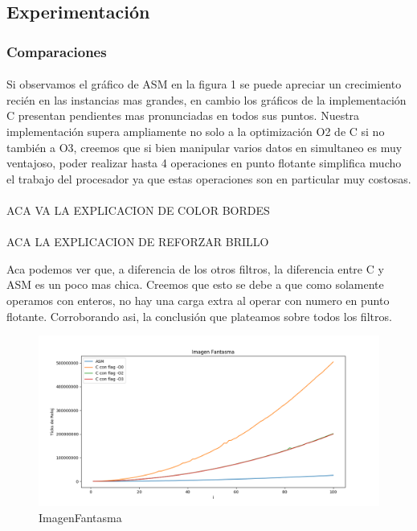 \documentclass[a4paper]{article}
\begin{document}
\subsection{Experimentaci\'on}

\subsubsection{Comparaciones}

\paragraph{} Si observamos el gr\'afico de ASM en la figura 1 se puede apreciar un crecimiento recién en las instancias mas grandes, en cambio los gr\'aficos de la implementaci\'on C presentan pendientes mas pronunciadas en todos sus puntos. Nuestra implementaci\'on supera ampliamente no solo a la optimizaci\'on O2 de C si no también a O3, creemos que si bien manipular varios datos en simultaneo es muy ventajoso, poder realizar hasta 4 operaciones en punto flotante simplifica mucho el trabajo del procesador ya que estas operaciones son en particular muy costosas.

\paragraph{} ACA VA LA EXPLICACION DE COLOR BORDES



\paragraph{} ACA LA EXPLICACION DE REFORZAR BRILLO 

Aca podemos ver que, a diferencia de los otros filtros, la diferencia entre C y ASM es un poco mas chica. Creemos que esto se debe a que como solamente operamos con enteros, no hay una carga extra al operar con numero en punto flotante. Corroborando asi, la conclusión que plateamos sobre todos los filtros.


	\begin{figure}[h!]			
			\includegraphics[width=\linewidth]{img/imagenFantasma.png}
			\caption{ImagenFantasma}
	\end{figure}
\end{document}
